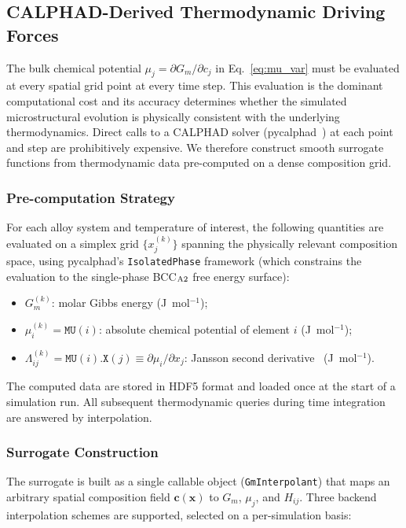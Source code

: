 \subsection{CALPHAD-Derived Thermodynamic Driving Forces}
\label{sec:calphad}

The bulk chemical potential $\mu_j = \partial G_m/\partial c_j$ in
Eq.~\eqref{eq:mu_var} must be evaluated at every spatial grid point
at every time step.  This evaluation is the dominant computational
cost and its accuracy determines whether the simulated microstructural
evolution is physically consistent with the underlying thermodynamics.
Direct calls to a CALPHAD solver (pycalphad~\cite{pycalphad}) at each
point and step are prohibitively expensive.  We therefore construct
smooth surrogate functions from thermodynamic data pre-computed on a
dense composition grid.

\subsubsection{Pre-computation Strategy}
For each alloy system and temperature of interest, the following
quantities are evaluated on a simplex grid
$\{x_j^{(k)}\}$ spanning the physically relevant composition space,
using pycalphad's \texttt{IsolatedPhase} framework (which constrains
the evaluation to the single-phase BCC$_{\rm A2}$ free energy
surface):
\begin{itemize}
  \item $G_m^{(k)}$: molar Gibbs energy (J~mol$^{-1}$);
  \item $\mu_i^{(k)} = \texttt{MU}(i)$: absolute chemical potential of
        element $i$ (J~mol$^{-1}$);
  \item $\Lambda_{ij}^{(k)} = \texttt{MU}(i)\texttt{.X}(j)
        \equiv \partial\mu_i/\partial x_j$:
        Jansson second derivative~\cite{jansson1984} (J~mol$^{-1}$).
\end{itemize}
The computed data are stored in HDF5 format and loaded once at the
start of a simulation run.  All subsequent thermodynamic queries
during time integration are answered by interpolation.

\subsubsection{Surrogate Construction}
The surrogate is built as a single callable object
(\texttt{GmInterpolant}) that maps an arbitrary spatial composition
field $\bm{c}(\bm{x})$ to $G_m$, $\mu_j$, and $H_{ij}$.  Three
backend interpolation schemes are supported, selected on a
per-simulation basis:

